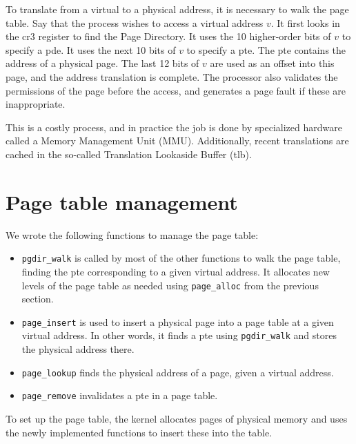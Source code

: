 \documentclass{report}
\begin{document}
To translate from a virtual to a physical address, it is necessary to walk the
page table. Say that the process wishes to access a virtual address $v$. It
first looks in the \gls{cr3} register to find the Page Directory. It uses the
10 higher-order bits of $v$ to specify a \gls{pde}. It uses the next 10 bits
of $v$ to specify a \gls{pte}. The \gls{pte} contains the address of a
physical page. The last 12 bits of $v$ are used as an offset into this page,
and the address translation is complete. The processor also validates the
permissions of the page before the access, and generates a page fault if these
are inappropriate.

This is a costly process, and in practice the job is done by specialized
hardware called a Memory Management Unit (MMU). Additionally, recent
translations are cached in the so-called Translation Lookaside Buffer
(\gls{tlb}).


\section{Page table management}
\label{sec:pagetables}
We wrote the following functions to manage the page table:
\begin{itemize}
\item \texttt{pgdir\_walk} is called by most of the other functions to walk the
page table, finding the \gls{pte} corresponding to a given virtual address. It
allocates new levels of the page table as needed using \texttt{page\_alloc}
from the previous section.
\item \texttt{page\_insert} is used to insert a physical page into a page
table at a given virtual address. In other words, it finds a \gls{pte} using
\texttt{pgdir\_walk} and stores the physical address there.
\item \texttt{page\_lookup} finds the physical address of a page, given a
virtual address.
\item \texttt{page\_remove} invalidates a \gls{pte} in a page table.
\end{itemize}
To set up the page table, the kernel allocates pages of physical memory and
uses the newly implemented functions to insert these into the table.
\end{document}
